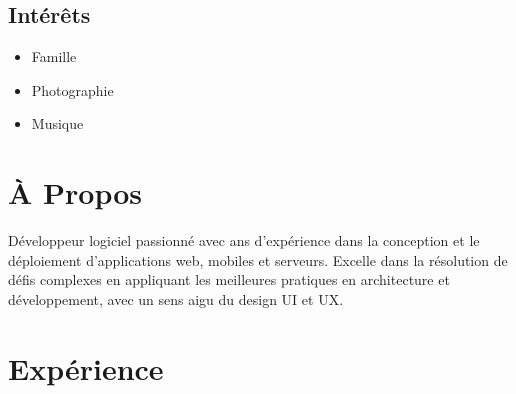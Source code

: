 \documentclass{article}
\begin{document}
\begin{paracol}{2}
\begin{leftcolumn}
    \section{Intérêts}

    \begin{itemize}
      \item Famille
      \item Photographie
      \item Musique
    \end{itemize}


  \end{leftcolumn}
  \begin{rightcolumn}

    \vspace{-2.5em}
    \section{À Propos}

    Développeur logiciel passionné avec  ans d’expérience dans la conception et le
    déploiement d’applications web, mobiles et serveurs. Excelle dans la résolution de défis complexes en
    appliquant les meilleures pratiques en architecture et développement, avec un sens aigu du design UI et UX. 

    \section{Expérience}


\end{rightcolumn}
\end{paracol}
\end{document}
